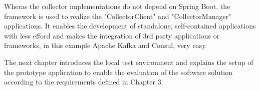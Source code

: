 Wheras the collector implementations do not depend on Spring Boot, the framework is used to realize the "CollectorClient" and
"CollectorManager" applications. It enables the development of standalone, self-contained applications with less efford and makes
the integration of 3rd party applications or frameworks, in this example Apache Kafka and Consul, very easy.

The next chapter introduces the local test environment and explains the setup of the prototype application to enable the
evaluation of the software solution according to the requirements defined in Chapter 3.